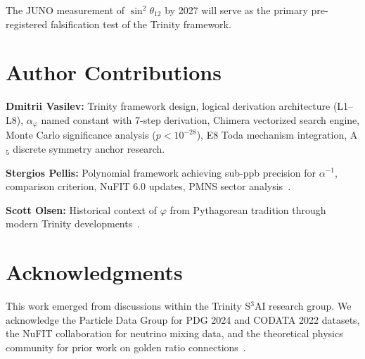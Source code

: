 \documentclass[10pt,a4paper]{article}
\begin{document}
The JUNO measurement of $\sin^2\theta_{12}$ by 2027 will serve as the primary
pre-registered falsification test of the Trinity framework.

\section*{Author Contributions}

\textbf{Dmitrii Vasilev:} Trinity framework design, logical derivation architecture (L1--L8),
$\alpha_\varphi$ named constant with 7-step derivation, Chimera vectorized search engine,
Monte Carlo significance analysis ($p < 10^{-28}$), E8 Toda mechanism integration,
A$_5$ discrete symmetry anchor research.

\textbf{Stergios Pellis:} Polynomial framework achieving sub-ppb precision for $\alpha^{-1}$,
comparison criterion, NuFIT 6.0 updates, PMNS sector analysis~\cite{chimera2026}.

\textbf{Scott Olsen:} Historical context of $\varphi$ from Pythagorean tradition through
modern Trinity developments~\cite{olsen2026}.

\section*{Acknowledgments}

This work emerged from discussions within the Trinity S$^3$AI research group. We acknowledge the
Particle Data Group for PDG 2024 and CODATA 2022 datasets, the NuFIT collaboration
for neutrino mixing data, and the theoretical physics community for prior work on golden
ratio connections~\cite{stakhov1970,naschie1979,sherbon2018,heyrovskaya2010,
ellis2016,meissner2004}.
\end{document}
